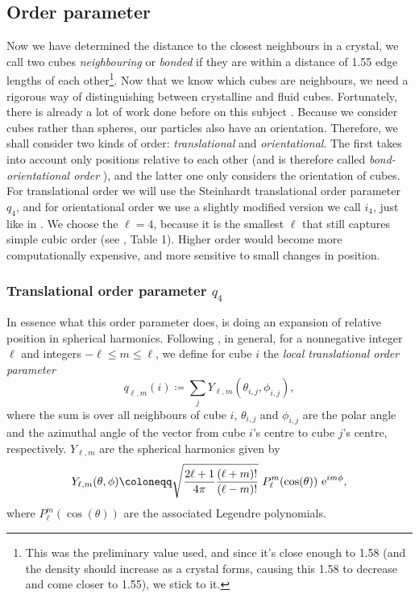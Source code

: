 \documentclass[thesis]{subfiles}
\begin{document}
\subsection{Order parameter}
Now we have determined the distance to the closest neighbours in a crystal, we call two cubes \emph{neighbouring} or \emph{bonded} if they are within a distance of 1.55 edge lengths of each other\footnote{This was the preliminary value used, and since it's close enough to 1.58 (and the density should increase as a crystal forms, causing this 1.58 to decrease and come closer to 1.55), we stick to it.}. Now that we know which cubes are neighbours, we need a rigorous way of distinguishing between crystalline and fluid cubes. Fortunately, there is already a lot of work done before on this subject \cite{steinhardt1983bond, lechner2008accurate, van2017phase, sharma2018disorder, mickel2013shortcomings}. Because we consider cubes rather than spheres, our particles also have an orientation. Therefore, we shall consider two kinds of order: \emph{translational} and \emph{orientational}. The first takes into account only positions relative to each other (and is therefore called \emph{bond-orientational order} \cite{steinhardt1983bond}), and the latter one only considers the orientation of cubes. For translational order we will use the Steinhardt translational order parameter \cite{steinhardt1983bond} $q_4$, and for orientational order we use a slightly modified version we call $i_4$, just like in \cite{sharma2018disorder}. We choose the $\ell = 4$, because it is the smallest $\ell$ that still captures simple cubic order (see \cite{mickel2013shortcomings}, Table 1). Higher order would become more computationally expensive, and more sensitive to small changes in position.

\subsubsection{Translational order parameter \texorpdfstring{$q_4$}{q4}}
In essence what this order parameter does, is doing an expansion of relative position in spherical harmonics. Following \cite{sharma2018disorder}, in general, for a nonnegative integer $\ell$ and integers $ -\ell \leq m \leq\ell$, we define for cube $i$ the \emph{local translational order parameter}
\begin{equation}
	q_{\ell, m}(i) \coloneqq \sum_{j} Y_{\ell, m} (\theta_{i, j}, \phi_{i, j}),
\end{equation}
where the sum is over all neighbours of cube $i$, $\theta_{i, j}$ and $\phi_{i, j}$ are the polar angle and the azimuthal angle of the vector from cube $i$'s centre to cube $j$'s centre, respectively. $Y_{\ell, m}$ are the spherical harmonics given by
\begin{equation}
	Y_{\ell, m}(\theta, \phi) \coloneqq \sqrt{\frac{2\ell + 1}{4\pi}\frac{(\ell + m)!}{(\ell - m)!}}\ P_\ell^m(\cos(\theta)) \ \me^{im\phi},
\end{equation}
where $P_\ell^m(\cos(\theta))$ are the associated Legendre polynomials. 
\end{document}
